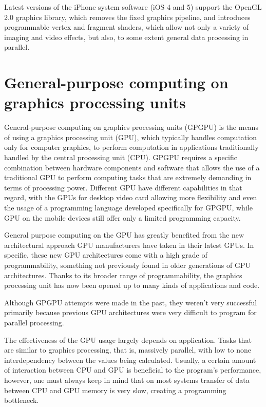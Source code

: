 Latest versions of the iPhone system software (iOS 4 and 5) support the OpenGL 2.0 graphics library, which removes the fixed graphics pipeline, and introduces programmable vertex and fragment shaders, which allow not only a variety of imaging and video effects, but also, to some extent general data processing in parallel. 

\section{General-purpose computing on graphics processing units}

General-purpose computing on graphics processing units (GPGPU) is the means of using a graphics processing unit (GPU), which typically handles computation only for computer graphics, to perform computation in applications traditionally handled by the central processing unit (CPU). 
 GPGPU requires a specific combination  between hardware components and software that allows the use of a traditional GPU to perform computing tasks that are extremely demanding in terms of processing power. Different GPU have different capabilities in that regard, with the GPUs for desktop video card allowing more flexibility and even the usage of a programming language developed specifically for GPGPU, while GPU on the mobile devices still offer only a limited programming capacity.  

General purpose computing on the GPU has greatly benefited from the new architectural approach GPU manufacturers have taken in their latest GPUs. In specific, these new GPU architectures come with a high grade of programmability, something not previously found in older generations of GPU architectures. Thanks to its broader range of programmability, the graphics processing unit has now been opened up to many kinds of applications and code.

Although GPGPU attempts were made in the past, they weren't very successful primarily because previous GPU architectures were very difficult to program for parallel processing. 

The effectiveness of the GPU usage largely depends on application. Tasks that are similar to graphics processing, that is, massively parallel, with low to none interdependency between the values being calculated. 
Usually, a certain amount of interaction between CPU and GPU is beneficial to the program's performance, however, one must always keep in mind that on most systems transfer of data between CPU and GPU memory is very slow, creating a programming bottleneck. 

